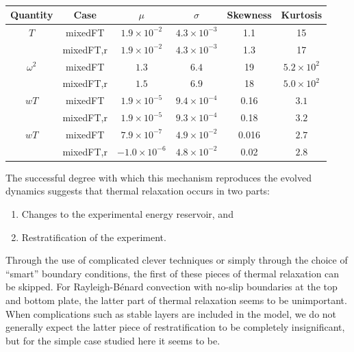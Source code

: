 \documentclass[aps, pre, onecolumn, nofootinbib, notitlepage, groupedaddress, amsfonts, amssymb, amsmath, longbibliography]{revtex4-1}
\newcommand{\RB}{Rayleigh-B\'{e}nard }
\begin{document}
\begin{table}[ht]
\caption{
}
\setlength{\tabcolsep}{12pt}
\label{table:speed}
\begin{center}
\begin{tabularx}{\textwidth}{c c c c c c}
\hline																	
Quantity &	Case	&	$\mu$	&	$\sigma$	&	Skewness	&	Kurtosis \\
\hline
$T$				&	mixedFT		&		$1.9 \times 10^{-2}$	&	$4.3 \times 10^{-3}$	&	1.1		&	15 \\
				&	mixedFT,r	&		$1.9 \times 10^{-2}$	&	$4.3 \times 10^{-3}$	&	1.3		&	17 \\
\hline
$\omega^2$		&	mixedFT		&		$1.3$					&	$6.4$					&	19		&	$5.2 \times 10^2$ \\
				&	mixedFT,r	&		$1.5$					&	$6.9$					&	18		&	$5.0 \times 10^2$ \\
\hline
$wT$			&	mixedFT		&		$1.9 \times 10^{-5}$	&	$9.4 \times 10^{-4}$	&	0.16	&	$3.1$ \\
				&	mixedFT,r	&		$1.9 \times 10^{-5}$	&	$9.3 \times 10^{-4}$	&	0.18	&	$3.2$ \\
\hline
$wT$			&	mixedFT		&		$7.9 \times 10^{-7}$	&	$4.9 \times 10^{-2}$	&	0.016	&	$2.7$ \\
				&	mixedFT,r	&		$-1.0 \times 10^{-6}$	&	$4.8 \times 10^{-2}$	&	0.02	&	$2.8$ \\
\hline																	
\end{tabularx}
\end{center}
\end{table}

The successful degree with which this mechanism reproduces the evolved dynamics suggests that thermal relaxation occurs in two parts:
\begin{enumerate}
\item Changes to the experimental energy reservoir, and
\item Restratification of the experiment.
\end{enumerate}
Through the use of complicated clever techniques \cite{anders&all2018} or simply through the choice of ``smart'' boundary conditions, the first of these pieces of thermal relaxation can be skipped.
For \RB convection with no-slip boundaries at the top and bottom plate, the latter part of thermal relaxation seems to be unimportant.
When complications such as stable layers are included in the model, we do not generally expect the latter piece of restratification to be completely insignificant, but for the simple case studied here it seems to be.
\end{document}
